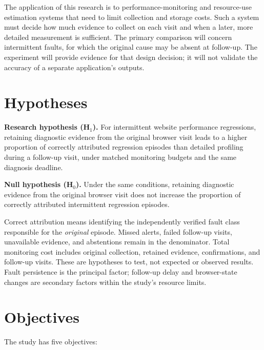 The application of this research is to performance-monitoring and resource-use estimation systems that need to limit collection and storage costs. Such a system must decide how much evidence to collect on each visit and when a later, more detailed measurement is sufficient. The primary comparison will concern intermittent faults, for which the original cause may be absent at follow-up. The experiment will provide evidence for that design decision; it will not validate the accuracy of a separate application's outputs.

\section{Hypotheses}

\textbf{Research hypothesis (H$_1$).} For intermittent website performance regressions, retaining diagnostic evidence from the original browser visit leads to a higher proportion of correctly attributed regression episodes than detailed profiling during a follow-up visit, under matched monitoring budgets and the same diagnosis deadline.

\textbf{Null hypothesis (H$_0$).} Under the same conditions, retaining diagnostic evidence from the original browser visit does not increase the proportion of correctly attributed intermittent regression episodes.

Correct attribution means identifying the independently verified fault class responsible for the \emph{original} episode. Missed alerts, failed follow-up visits, unavailable evidence, and abstentions remain in the denominator. Total monitoring cost includes original collection, retained evidence, confirmations, and follow-up visits. These are hypotheses to test, not expected or observed results. Fault persistence is the principal factor; follow-up delay and browser-state changes are secondary factors within the study's resource limits.

\section{Objectives}

The study has five objectives:

